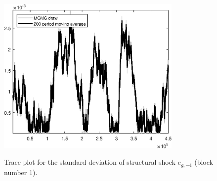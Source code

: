 \begin{figure}[H]
\centering
  \includegraphics[width=0.8\textwidth]{BRS_sectoral_wo_demand_shocks/graphs/TracePlot_SE_e_g_news_blck_1}\\
    \caption{Trace plot for the standard deviation of structural shock ${e_{g,-4}}$ (block number 1).}
\end{figure}
